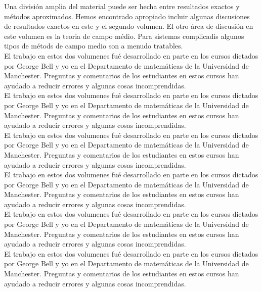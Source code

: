  Una división amplia del material puede ser hecha entre resultados exactos y métodos aproximados. Hemos encontrado apropiado incluir algunas discusiones de resultados 
 exactos en este y el segundo volumen. El otro área de discusión en este volumen
 es la teoria de campo médio. Para sistemas complicadis algunos tipos de métods de campo medio son a menudo tratables.\\

 El trabajo en estos dos volumenes fué desarrollado en parte en los cursos dictados
 por George Bell y yo en el Departamento de matemáticas de la Universidad de Manchester. Preguntas y comentarios de los estudiantes en estos cursos han ayudado a reducir errores y algunas cosas incomprendidas.\\
  
 El trabajo en estos dos volumenes fué desarrollado en parte en los cursos dictados
 por George Bell y yo en el Departamento de matemáticas de la Universidad de Manchester. Preguntas y comentarios de los estudiantes en estos cursos han ayudado a reducir errores y algunas cosas incomprendidas.\\
  
 El trabajo en estos dos volumenes fué desarrollado en parte en los cursos dictados
 por George Bell y yo en el Departamento de matemáticas de la Universidad de Manchester. Preguntas y comentarios de los estudiantes en estos cursos han ayudado a reducir errores y algunas cosas incomprendidas.\\
  

 El trabajo en estos dos volumenes fué desarrollado en parte en los cursos dictados
 por George Bell y yo en el Departamento de matemáticas de la Universidad de Manchester. Preguntas y comentarios de los estudiantes en estos cursos han ayudado a reducir errores y algunas cosas incomprendidas.\\
  

 El trabajo en estos dos volumenes fué desarrollado en parte en los cursos dictados
 por George Bell y yo en el Departamento de matemáticas de la Universidad de Manchester. Preguntas y comentarios de los estudiantes en estos cursos han ayudado a reducir errores y algunas cosas incomprendidas.\\
  

 El trabajo en estos dos volumenes fué desarrollado en parte en los cursos dictados
 por George Bell y yo en el Departamento de matemáticas de la Universidad de Manchester. Preguntas y comentarios de los estudiantes en estos cursos han ayudado a reducir errores y algunas cosas incomprendidas.\\
  
\newpage 
